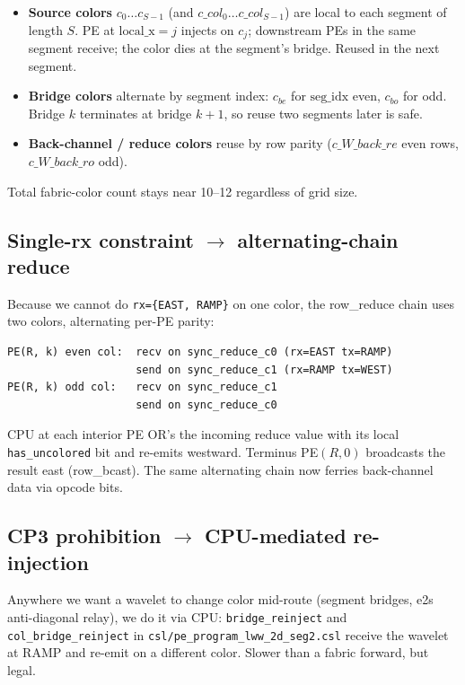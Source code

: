 \documentclass[11pt]{article}
\newcommand{\code}[1]{\texttt{#1}}
\newcommand{\file}[1]{\texttt{#1}}
\begin{document}
\begin{itemize}[leftmargin=1.1em,itemsep=0.2em]
  \item \textbf{Source colors} $c_0 \ldots c_{S-1}$ (and
    $c\_col_0 \ldots c\_col_{S-1}$) are local to each segment of
    length $S$. PE at $\mathrm{local\_x}=j$ injects on $c_j$;
    downstream PEs in the same segment receive; the color dies at
    the segment's bridge. Reused in the next segment.
  \item \textbf{Bridge colors} alternate by segment index:
    $c_{be}$ for $\mathrm{seg\_idx}$ even, $c_{bo}$ for odd.
    Bridge $k$ terminates at bridge $k{+}1$, so reuse two segments
    later is safe.
  \item \textbf{Back-channel / reduce colors} reuse by row parity
    ($c\_W\_back\_re$ even rows, $c\_W\_back\_ro$ odd).
\end{itemize}

Total fabric-color count stays near 10--12 regardless of grid size.

\subsection{Single-rx constraint $\to$ alternating-chain reduce}
Because we cannot do \code{rx=\{EAST, RAMP\}} on one color, the
row\_reduce chain uses two colors, alternating per-PE parity:

\begin{lstlisting}
PE(R, k) even col:  recv on sync_reduce_c0 (rx=EAST tx=RAMP)
                    send on sync_reduce_c1 (rx=RAMP tx=WEST)
PE(R, k) odd col:   recv on sync_reduce_c1
                    send on sync_reduce_c0
\end{lstlisting}

CPU at each interior PE OR's the incoming reduce value with its
local \code{has\_uncolored} bit and re-emits westward. Terminus
PE$(R, 0)$ broadcasts the result east (row\_bcast). The same
alternating chain now ferries back-channel data via opcode bits.

\subsection{CP3 prohibition $\to$ CPU-mediated re-injection}
Anywhere we want a wavelet to change color mid-route (segment
bridges, e2s anti-diagonal relay), we do it via CPU:
\code{bridge\_reinject} and \code{col\_bridge\_reinject} in
\file{csl/pe\_program\_lww\_2d\_seg2.csl} receive the wavelet at
RAMP and re-emit on a different color. Slower than a fabric
forward, but legal.
\end{document}
